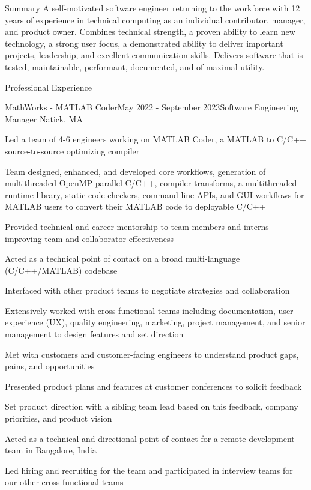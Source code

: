 \documentclass[
	usletter %
	10pt, %
]{resume} %
\begin{document}
\begin{rSection}{Summary}
	A self-motivated software engineer returning to the workforce with 12 years of experience in technical computing as an individual contributor, manager, and product owner. Combines technical strength, a proven ability to learn new technology, a strong user focus, a demonstrated ability to deliver important projects, leadership, and excellent communication skills. Delivers software that is tested, maintainable, performant, documented, and of maximal utility.
\end{rSection}

\begin{rSection}{Professional Experience}
	\begin{rSubsection}{MathWorks - MATLAB Coder}{May 2022 - September 2023}{Software Engineering Manager}
		{Natick, MA}
		\item Led a team of 4-6 engineers working on MATLAB Coder, a MATLAB to C/C++ source-to-source optimizing compiler
		\item Team designed, enhanced, and developed core workflows, generation of multithreaded OpenMP parallel C/C++, compiler transforms, a multithreaded runtime library, static code checkers, command-line APIs, and GUI workflows for MATLAB users to convert their MATLAB code to deployable C/C++ %
		\item Provided technical and career mentorship to team members and interns improving team and collaborator effectiveness
		\item Acted as a technical point of contact on a broad multi-language (C/C++/MATLAB) codebase
		\item Interfaced with other product teams to negotiate strategies and collaboration
		\item Extensively worked with cross-functional teams including documentation, user experience (UX), quality engineering, marketing, project management, and senior management to design features and set direction
		\item Met with customers and customer-facing engineers to understand product gaps, pains, and opportunities
		\item Presented product plans and features at customer conferences to solicit feedback
		\item Set product direction with a sibling team lead based on this feedback, company priorities, and product vision
		\item Acted as a technical and directional point of contact for a remote development team in Bangalore, India
		\item Led hiring and recruiting for the team and participated in interview teams for our other cross-functional teams
	\end{rSubsection}


\end{rSection}
\end{document}
